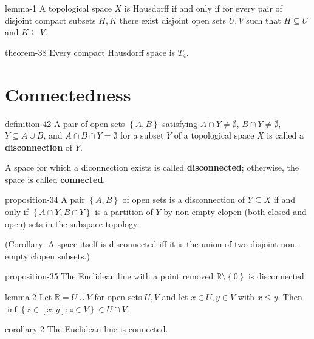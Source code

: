 \documentclass[10pt,]{article}
\newcommand{\terminology}[1]{\textbf{#1}}
\newcommand{\mb}{\mathbb}
\newcommand{\setBuilder}[2]{\left\{#1:#2\right\}}
\newcommand{\setList}[1]{\left\{#1\right\}}
\begin{document}
\begin{lemma}{}{}{lemma-1}%
\hypertarget{p-154}{}%
A topological space \(X\) is Hausdorff if and only if for every pair of disjoint compact subsets \(H,K\) there exist disjoint open sets \(U,V\) such that \(H\subseteq U\) and \(K\subseteq V\).%
\end{lemma}
\begin{theorem}{}{}{theorem-38}%
\hypertarget{p-155}{}%
Every compact Hausdorff space is \(T_4\).%
\end{theorem}
%
%
\typeout{************************************************}
\typeout{************************************************}
%
\section[{Connectedness}]{Connectedness}\label{section-connected}
\begin{definition}{}{definition-42}%
\hypertarget{p-156}{}%
A pair of open sets \(\setList{A,B}\) satisfying \(A\cap Y\not=\emptyset\), \(B\cap Y\not=\emptyset\), \(Y\subseteq A\cup B\), and \(A\cap B\cap Y=\emptyset\) for a subset \(Y\) of a topological space \(X\) is called a \terminology{disconnection} of \(Y\).%
\par
\hypertarget{p-157}{}%
A space for which a diconnection exists is called \terminology{disconnected}; otherwise, the space is called \terminology{connected}.%
\end{definition}
\begin{proposition}{}{}{proposition-34}%
\hypertarget{p-158}{}%
A pair \(\setList{A,B}\) of open sets is a disconnection of \(Y\subseteq X\) if and only if \(\setList{A\cap Y,B\cap Y}\) is a partition of \(Y\) by non-empty clopen (both closed and open) sets in the subspace topology.%
\end{proposition}
\hypertarget{p-159}{}%
(Corollary: A space itself is disconnected iff it is the union of two disjoint non-empty clopen subsets.)%
\begin{proposition}{}{}{proposition-35}%
\hypertarget{p-160}{}%
The Euclidean line with a point removed \(\mb R\setminus\setList{0}\) is disconnected.%
\end{proposition}
\begin{lemma}{}{}{lemma-2}%
\hypertarget{p-161}{}%
Let \(\mb R=U\cup V\) for open sets \(U,V\) and let \(x\in U,y\in V\) with \(x\leq y\).  Then \(\inf\setBuilder{z\in[x,y]}{z\in V}\in U\cap V\).%
\end{lemma}
\begin{corollary}{}{}{corollary-2}%
\hypertarget{p-162}{}%
The Euclidean line is connected.%
\end{corollary}
\end{document}
